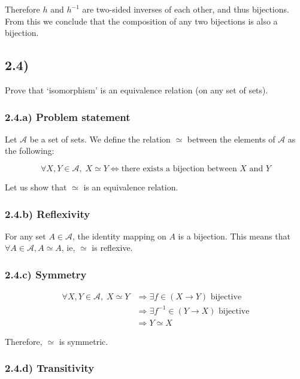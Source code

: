\documentclass[12pt, letterpaper, twoside]{report}
\begin{document}
Therefore $h$ and $h^{-1}$ are two-sided inverses of each other, and thus bijections. From this we conclude that the composition of any two bijections is also a bijection.



\subsection*{2.4)}

Prove that ‘isomorphism’ is an equivalence relation (on any set of sets).

\subsubsection*{2.4.a) Problem statement}

Let $\mathcal{A}$ be a set of sets. We define the relation $\simeq$ between the elements of $\mathcal{A}$ as the following:

$$\forall X, Y \in \mathcal{A}, \; X \simeq Y \Leftrightarrow \text {there exists a bijection between $X$ and $Y$}$$

Let us show that $\simeq$ is an equivalence relation.


\subsubsection*{2.4.b) Reflexivity}

For any set $A \in \mathcal{A}$, the identity mapping on $A$ is a bijection. This means that $\forall A \in \mathcal{A}, A \simeq A$, ie, $\simeq$ is reflexive.


\subsubsection*{2.4.c) Symmetry}

$$
\begin{aligned}
\forall X, Y \in \mathcal{A}, \; X \simeq Y & \Rightarrow \exists f      \in (X \to Y) \text{ bijective} \\
                                            & \Rightarrow \exists f^{-1} \in (Y \to X) \text{ bijective} \\
                                            & \Rightarrow Y \simeq X
\end{aligned}
$$

Therefore, $\simeq$ is symmetric.


\subsubsection*{2.4.d) Transitivity}
\end{document}
